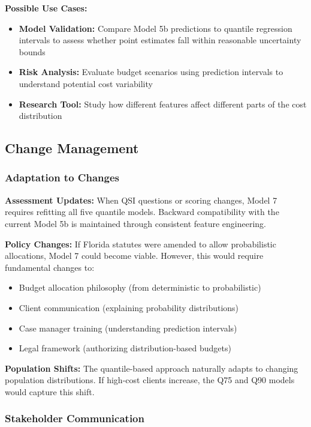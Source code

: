 \textbf{Possible Use Cases:}
\begin{itemize}
\item \textbf{Model Validation:} Compare Model 5b predictions to quantile regression intervals to assess whether point estimates fall within reasonable uncertainty bounds
\item \textbf{Risk Analysis:} Evaluate budget scenarios using prediction intervals to understand potential cost variability
\item \textbf{Research Tool:} Study how different features affect different parts of the cost distribution
\end{itemize}

\subsection{Change Management}

\subsubsection{Adaptation to Changes}

\textbf{Assessment Updates:}
When QSI questions or scoring changes, Model 7 requires refitting all five quantile models. Backward compatibility with the current Model 5b is maintained through consistent feature engineering.

\textbf{Policy Changes:}
If Florida statutes were amended to allow probabilistic allocations, Model 7 could become viable. However, this would require fundamental changes to:
\begin{itemize}
\item Budget allocation philosophy (from deterministic to probabilistic)
\item Client communication (explaining probability distributions)
\item Case manager training (understanding prediction intervals)
\item Legal framework (authorizing distribution-based budgets)
\end{itemize}

\textbf{Population Shifts:}
The quantile-based approach naturally adapts to changing population distributions. If high-cost clients increase, the Q75 and Q90 models would capture this shift.

\subsubsection{Stakeholder Communication}

